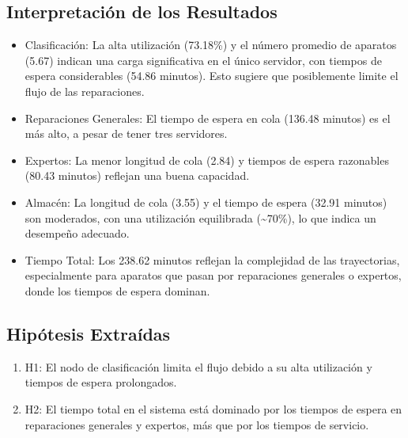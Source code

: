 \documentclass[12pt]{article}
\begin{document}
\subsection{Interpretación de los Resultados}
\begin{itemize}
    \item Clasificación: La alta utilización (73.18\%) y el número promedio de aparatos (5.67) indican una carga significativa en el único servidor, con tiempos de espera considerables (54.86 minutos). Esto sugiere que posiblemente limite el flujo de las reparaciones.
    \item Reparaciones Generales: El tiempo de espera en cola (136.48 minutos) es el más alto, a pesar de tener tres servidores.
    \item Expertos: La menor longitud de cola (2.84) y tiempos de espera razonables (80.43 minutos) reflejan una buena capacidad.
    \item Almacén: La longitud de cola (3.55) y el tiempo de espera (32.91 minutos) son moderados, con una utilización equilibrada (\textasciitilde 70\%), lo que indica un desempeño adecuado.
    \item Tiempo Total: Los 238.62 minutos reflejan la complejidad de las trayectorias, especialmente para aparatos que pasan por reparaciones generales o expertos, donde los tiempos de espera dominan.
\end{itemize}

\subsection{Hipótesis Extraídas}
\begin{enumerate}
    \item H1: El nodo de clasificación limita el flujo debido a su alta utilización y tiempos de espera prolongados.
    \item H2: El tiempo total en el sistema está dominado por los tiempos de espera en reparaciones generales y expertos, más que por los tiempos de servicio.
\end{enumerate}
\end{document}
